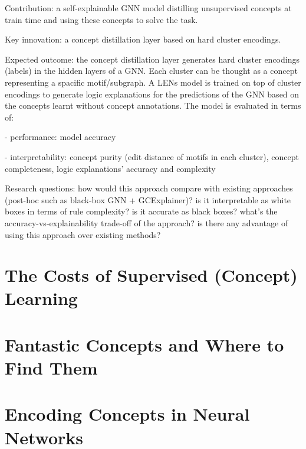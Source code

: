 Contribution: a self-explainable GNN model distilling unsupervised concepts at train time and using these concepts to solve the task.

Key innovation: a concept distillation layer based on hard cluster encodings.

Expected outcome: the concept distillation layer generates hard cluster encodings (labels) in the hidden layers of a GNN. Each cluster can be thought as a concept representing a spacific motif/subgraph. A LENs model is trained on top of cluster encodings to generate logic explanations for the predictions of the GNN based on the concepts learnt without concept annotations. The model is evaluated in terms of:

- performance: model accuracy

- interpretability: concept purity (edit distance of motifs in each cluster), concept completeness, logic explanations' accuracy and complexity

Research questions: how would this approach compare with existing approaches (post-hoc such as black-box GNN + GCExplainer)? is it interpretable as white boxes in terms of rule complexity? is it accurate as black boxes? what's the accuracy-vs-explainability trade-off of the approach? is there any advantage of using this approach over existing methods?


\section{The Costs of Supervised (Concept) Learning}

\section{Fantastic Concepts and Where to Find Them}

\section{Encoding Concepts in Neural Networks}

